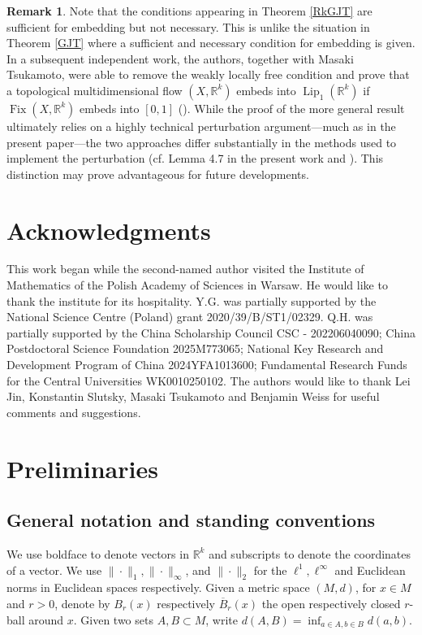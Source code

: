 \documentclass[11pt]{article}
\theoremstyle{plain}
\theoremstyle{definition}
\newtheorem{rem}[thm]{Remark}
\DeclareMathOperator{\Lip}{Lip}
\DeclareMathOperator{\Fix}{Fix}
\def\R{\mathbb{R}}
\def\Rk{\mathbb{R}^k}
\numberwithin{figure}{section}
\begin{document}
\begin{rem}\label{notation_Lipfirst}
     Note that the conditions appearing in Theorem \ref{RkGJT}  are sufficient for embedding but not necessary. This is unlike the situation in Theorem \ref{GJT} where a sufficient and necessary condition for embedding is given. In a subsequent independent work, the authors, together with Masaki Tsukamoto, were able to remove the weakly locally free condition and prove that a topological multidimensional flow $(X,\mathbb{R}^k)$ embeds into $\Lip_{1}(\mathbb{R}^k)$ if $\Fix(X,\R^k)$ embeds into $[0,1]$ (\cite[Theorem 1.7]{gutman2025lipschitz}).  While the proof of the more general result ultimately relies on a highly technical perturbation argument—much as in the present paper—the two approaches differ substantially in the methods used to implement the perturbation (cf. Lemma 4.7 in the present work and \cite[Propositions 3.1 \& 3.3]{gutman2025lipschitz}). This distinction may prove advantageous for future developments.
     \end{rem}


\section*{Acknowledgments}
\indent\indent  
This work began while the second-named author visited the Institute of Mathematics of the Polish Academy of Sciences in Warsaw. He would like to thank the institute for its hospitality. Y.G. was partially supported by the National Science Centre (Poland) grant 2020/39/B/ST1/02329. Q.H. was partially supported by the China Scholarship Council CSC - 202206040090; China Postdoctoral Science Foundation 2025M773065; National Key Research and Development Program of China 2024YFA1013600; Fundamental Research Funds for the Central Universities WK0010250102. The authors would like to thank Lei Jin, Konstantin Slutsky, Masaki Tsukamoto and Benjamin Weiss for useful comments and suggestions. 




\section{Preliminaries}\label{sec:Preliminaries}
\subsection{General notation and standing conventions}
We use boldface to denote vectors in $\Rk$ and subscripts to denote the coordinates of a vector. 
We use $\|\cdot\|_1,\|\cdot\|_{\infty}$, and $\|\cdot\|_2$ for the $\ell^1,\ell^\infty$ and Euclidean norms in Euclidean spaces respectively.
Given a metric space $(M,d)$, for $x\in M$ and $r>0$, denote by $B_r(x)$ respectively $\overline{B}_r(x)$ the open respectively closed $r$-ball around $x$. Given two sets $A,B\subset M$, write $d(A,B)=\inf_{a\in A,b\in B} d(a,b)$. 
\end{document}
